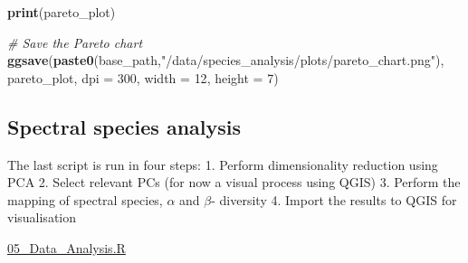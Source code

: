 \documentclass[
]{article}
\newenvironment{Shaded}{\begin{snugshade}}{\end{snugshade}}
\newcommand{\AttributeTok}[1]{\textcolor[rgb]{0.13,0.29,0.53}{#1}}
\newcommand{\CommentTok}[1]{\textcolor[rgb]{0.56,0.35,0.01}{\textit{#1}}}
\newcommand{\DecValTok}[1]{\textcolor[rgb]{0.00,0.00,0.81}{#1}}
\newcommand{\FunctionTok}[1]{\textcolor[rgb]{0.13,0.29,0.53}{\textbf{#1}}}
\newcommand{\NormalTok}[1]{#1}
\newcommand{\StringTok}[1]{\textcolor[rgb]{0.31,0.60,0.02}{#1}}
\begin{document}
\begin{Shaded}
\begin{Highlighting}[]
\FunctionTok{print}\NormalTok{(pareto\_plot)}

\CommentTok{\# Save the Pareto chart}
\FunctionTok{ggsave}\NormalTok{(}\FunctionTok{paste0}\NormalTok{(base\_path,}\StringTok{"/data/species\_analysis/plots/pareto\_chart.png"}\NormalTok{), pareto\_plot, }\AttributeTok{dpi =} \DecValTok{300}\NormalTok{, }\AttributeTok{width =} \DecValTok{12}\NormalTok{, }\AttributeTok{height =} \DecValTok{7}\NormalTok{)}
\end{Highlighting}
\end{Shaded}

\subsection{Spectral species analysis}\label{spectral-species-analysis}

The last script is run in four steps: 1. Perform dimensionality
reduction using PCA 2. Select relevant PCs (for now a visual process
using QGIS) 3. Perform the mapping of spectral species, \(\alpha\) and
\(\beta\)- diversity 4. Import the results to QGIS for visualisation

\href{https://github.com/patrickangst/UWW200_Master_Thesis_public/blob/main/MasterThesisRCode/05_Data_Analysis.R}{05\_Data\_Analysis.R}
\end{document}
